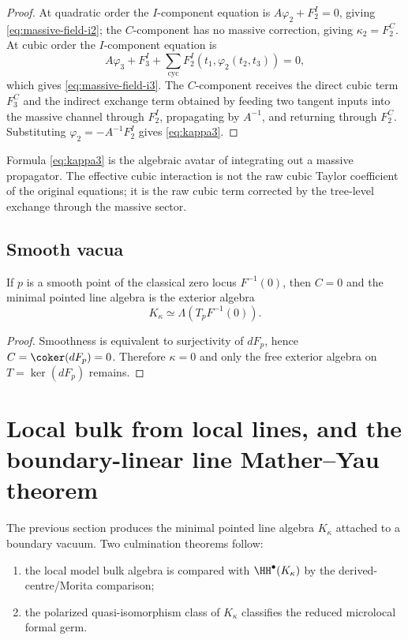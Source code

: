 \begin{proof}
At quadratic order the \(I\)-component equation is
\(A\varphi_2+F_2^I=0\), giving
\eqref{eq:massive-field-i2}; the \(C\)-component has no massive
correction, giving \(\kappa_2=F_2^C\).  At cubic order the
\(I\)-component equation is
\[
A\varphi_3+F_3^I
+\sum_{\mathrm{cyc}}F_2^I(t_1,\varphi_2(t_2,t_3))=0,
\]
which gives \eqref{eq:massive-field-i3}.  The \(C\)-component receives
the direct cubic term \(F_3^C\) and the indirect exchange term obtained
by feeding two tangent inputs into the massive channel through \(F_2^I\),
propagating by \(A^{-1}\), and returning through \(F_2^C\).  Substituting
\(\varphi_2=-A^{-1}F_2^I\) gives \eqref{eq:kappa3}.
\end{proof}

\begin{remark}
Formula \eqref{eq:kappa3} is the algebraic avatar of integrating out a massive propagator. The effective cubic interaction is not the raw cubic Taylor coefficient of the original equations; it is the raw cubic term corrected by the tree-level exchange through the massive sector.
\end{remark}

\subsection{Smooth vacua}

\begin{corollary}\label{cor:smooth-formality}
If $p$ is a smooth point of the classical zero locus $F^{-1}(0)$, then $C=0$ and the minimal pointed line algebra is the exterior algebra
\[
K_\kappa\simeq \Lambda(T_pF^{-1}(0)).
\]
\end{corollary}

\begin{proof}
Smoothness is equivalent to surjectivity of $dF_p$, hence $C=\coker(dF_p)=0$. Therefore $\kappa=0$ and only the free exterior algebra on $T=\ker(dF_p)$ remains.
\end{proof}


\section{Local bulk from local lines, and the boundary-linear line Mather--Yau theorem}\label{sec:classification}

The previous section produces the minimal pointed line algebra $K_\kappa$ attached to a boundary vacuum. Two culmination theorems follow:
\begin{enumerate}[label=(\arabic*),leftmargin=1.8em]
\item the local model bulk algebra is compared with
 \(\HH^\bullet(K_\kappa)\) by the derived-centre/Morita comparison;
\item the polarized quasi-isomorphism class of $K_\kappa$ classifies the reduced microlocal formal germ.
\end{enumerate}

